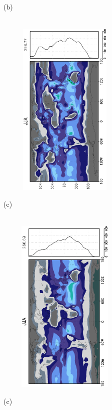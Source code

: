 \documentclass[12pt,a4paper,twoside,openright,headinclude,liststotoc,bibtotoc]{scrreprt}
\begin{document}
\begin{figure}[H]
{}
\parbox{8.5cm}{\hspace{0.50cm}\begin{scriptsize}(b)\end{scriptsize} \vspace{-0.7cm} \\
\includegraphics[height=8.5cm,width=6.5cm,angle=-90]
{eps/zonalysmevap182JJA.eps}
}
\parbox{8.5cm}{\hspace{0.30cm}\begin{scriptsize}(e)\end{scriptsize} \vspace{-0.7cm} \\
\includegraphics[height=8.5cm,width=6.5cm,angle=-90]
{eps/zonalt21ysmevapJJA.eps}
}
\parbox{8.4cm}{\hspace{0.50cm}\begin{scriptsize}(c)\end{scriptsize} \vspace{-0.7cm} \\
}
\end{figure}
\end{document}
